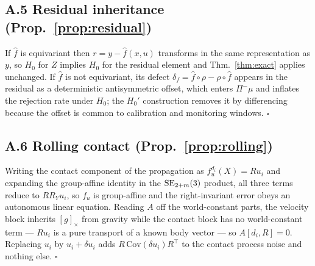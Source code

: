 \subsection*{A.5 Residual inheritance (Prop.~\ref{prop:residual})}
If $\hat f$ is equivariant then $r=y-\hat f(x,u)$ transforms in the same representation as $y$, so $H_0$ for $Z$ implies
$H_0$ for the residual element and Thm.~\ref{thm:exact} applies unchanged. If $\hat f$ is not equivariant, its defect
$\delta_f = \hat f\circ\rho - \rho\circ\hat f$ appears in the residual as a deterministic antisymmetric offset, which
enters $\Pi^-\mu$ and inflates the rejection rate under $H_0$; the $H_0'$ construction removes it by differencing
because the offset is common to calibration and monitoring windows. \hfill$\square$

\subsection*{A.6 Rolling contact (Prop.~\ref{prop:rolling})}
Writing the contact component of the propagation as $f^{d_i}_u(X)=Ru_i$ and expanding the group-affine identity in the
$\mathrm{SE}_{2+m}(3)$ product, all three terms reduce to $RR_Yu_i$, so $f_u$ is group-affine and the right-invariant error obeys
an autonomous linear equation. Reading $A$ off the world-constant parts, the velocity block inherits $[g]_\times$ from
gravity while the contact block has no world-constant term --- $Ru_i$ is a pure transport of a known body vector --- so
$A[d_i,R]=0$. Replacing $u_i$ by $u_i+\delta u_i$ adds $R\,\mathrm{Cov}(\delta u_i)R^\top$ to the contact process noise
and nothing else. \hfill$\square$
